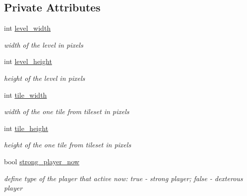\subsection*{Private Attributes}
\begin{DoxyCompactItemize}
\item 
\mbox{\label{class_level_a9d19634a546f199e98e01d97b02e2d2a}} 
int \hyperlink{class_level_a9d19634a546f199e98e01d97b02e2d2a}{level\+\_\+width}
\begin{DoxyCompactList}\small\item\em width of the level in pixels \end{DoxyCompactList}\item 
\mbox{\label{class_level_ae360d8c791cebb14d097de1e60c64b64}} 
int \hyperlink{class_level_ae360d8c791cebb14d097de1e60c64b64}{level\+\_\+height}
\begin{DoxyCompactList}\small\item\em height of the level in pixels \end{DoxyCompactList}\item 
\mbox{\label{class_level_ac846cb2f8b1bd0f92a60a484ce1e50ef}} 
int \hyperlink{class_level_ac846cb2f8b1bd0f92a60a484ce1e50ef}{tile\+\_\+width}
\begin{DoxyCompactList}\small\item\em width of the one tile from tileset in pixels \end{DoxyCompactList}\item 
\mbox{\label{class_level_a75ae0539332f57c52edac380fa0fc0c3}} 
int \hyperlink{class_level_a75ae0539332f57c52edac380fa0fc0c3}{tile\+\_\+height}
\begin{DoxyCompactList}\small\item\em height of the one tile from tileset in pixels \end{DoxyCompactList}\item 
\mbox{\label{class_level_a9b248f2588ae94e071750a8b2ba06e71}} 
bool \hyperlink{class_level_a9b248f2588ae94e071750a8b2ba06e71}{strong\+\_\+player\+\_\+now}
\begin{DoxyCompactList}\small\item\em define type of the player that active now\+: \textquotesingle{}true\textquotesingle{} -\/ strong player; \textquotesingle{}false\textquotesingle{} -\/ dexterous player \end{DoxyCompactList}\item 

\end{DoxyCompactItemize}
